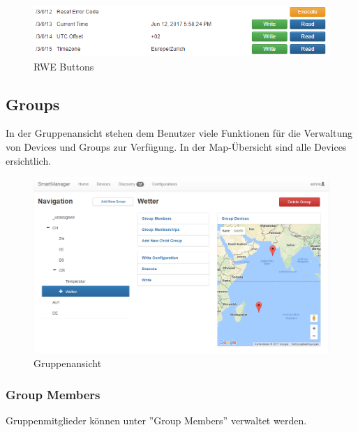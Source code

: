 \begin{figure}[H]
\centering
\includegraphics[scale=0.7]{../04_Realisierung/images/userinterface/rwe.png}
\caption{RWE Buttons}
\end{figure}

\subsection{Groups}
In der Gruppenansicht stehen dem Benutzer viele Funktionen für die Verwaltung von Devices und Groups zur Verfügung. In der Map-Übersicht sind alle Devices ersichtlich.

\begin{figure}[H]
\centering
\includegraphics[scale=0.57]{../04_Realisierung/images/userinterface/groups.png}
\caption{Gruppenansicht}
\end{figure}

\subsubsection{Group Members}
Gruppenmitglieder können unter ''Group Members'' verwaltet werden. 

